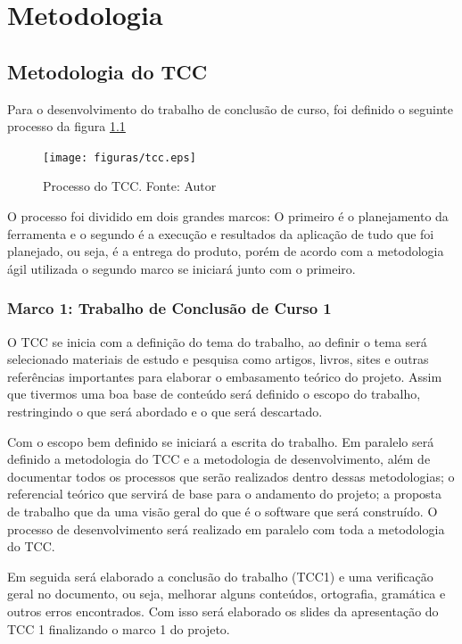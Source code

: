\chapter{Metodologia}

\section{Metodologia do TCC}

Para o desenvolvimento do trabalho de conclusão de curso, foi definido o seguinte processo da figura \ref{fig:tcc}

\begin{figure}[h!]
	\centering
  \texttt{[image: figuras/tcc.eps]}
  \caption[Processo do TCC.]{Processo do TCC. Fonte: Autor}
	\label{fig:tcc}
\end{figure}


O processo foi dividido em dois grandes marcos: O primeiro é o planejamento da ferramenta e o segundo é a execução e resultados da aplicação de tudo que foi planejado, ou seja, é a entrega do produto, porém de acordo com a metodologia ágil utilizada o segundo marco se iniciará junto com o primeiro.

\subsection{Marco 1: Trabalho de Conclusão de Curso 1}

O TCC se inicia com a definição do tema do trabalho, ao definir o tema será selecionado materiais de estudo e pesquisa como artigos, livros, sites e outras referências importantes para elaborar o embasamento teórico do projeto. Assim que tivermos uma boa base de conteúdo será definido o escopo do trabalho, restringindo o que será abordado e o que será descartado.

Com o escopo bem definido se iniciará a escrita do trabalho. Em paralelo será definido a metodologia do TCC e a metodologia de desenvolvimento, além de documentar todos os processos que serão realizados dentro dessas metodologias; o referencial teórico que servirá de base para o andamento do projeto; a proposta de trabalho que da uma visão geral do que é o software que será construído. O processo de desenvolvimento será realizado em paralelo com toda a metodologia do TCC.

Em seguida será elaborado a conclusão do trabalho (TCC1) e uma verificação geral no documento, ou seja, melhorar alguns conteúdos, ortografia, gramática e outros erros encontrados. Com isso será elaborado os slides da apresentação do TCC 1 finalizando o marco 1 do projeto.

